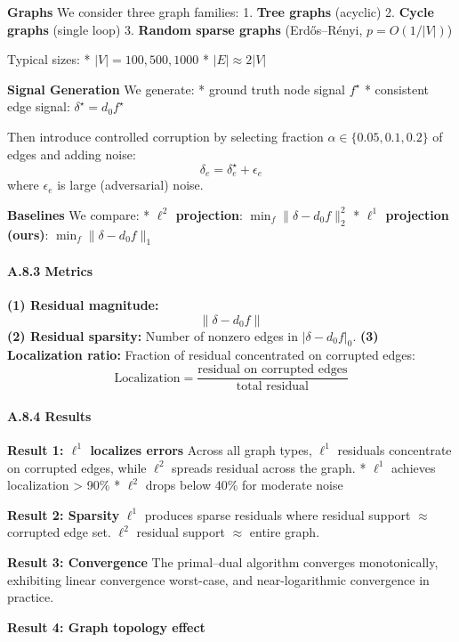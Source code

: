 \documentclass[
]{article}
\begin{document}
\textbf{Graphs} We consider three graph families: 1. \textbf{Tree
graphs} (acyclic) 2. \textbf{Cycle graphs} (single loop) 3.
\textbf{Random sparse graphs} (Erdős--Rényi, \(p = O(1/|V|)\))

Typical sizes: * \(|V| = 100, 500, 1000\) * \(|E| \approx 2|V|\)

\textbf{Signal Generation} We generate: * ground truth node signal
\(f^\star\) * consistent edge signal: \(\delta^\star = d_0 f^\star\)

Then introduce controlled corruption by selecting fraction
\(\alpha \in \{0.05, 0.1, 0.2\}\) of edges and adding noise:
\[ \delta_e = \delta^\star_e + \epsilon_e \] where \(\epsilon_e\) is
large (adversarial) noise.

\textbf{Baselines} We compare: * \textbf{\(\ell^2\) projection}:
\(\min_f \|\delta - d_0 f\|_2^2\) * \textbf{\(\ell^1\) projection
(ours)}: \(\min_f \|\delta - d_0 f\|_1\)

\paragraph{A.8.3 Metrics}\label{a.8.3-metrics}

\textbf{(1) Residual magnitude:} \[ \|\delta - d_0 f\| \] \textbf{(2)
Residual sparsity:} Number of nonzero edges in \(|\delta - d_0 f|_0\).
\textbf{(3) Localization ratio:} Fraction of residual concentrated on
corrupted edges:
\[ \text{Localization} = \frac{\text{residual on corrupted edges}}{\text{total residual}} \]

\paragraph{A.8.4 Results}\label{a.8.4-results}

\textbf{Result 1: \(\ell^1\) localizes errors} Across all graph types,
\(\ell^1\) residuals concentrate on corrupted edges, while \(\ell^2\)
spreads residual across the graph. * \(\ell^1\) achieves localization
\textgreater{} 90\% * \(\ell^2\) drops below 40\% for moderate noise

\textbf{Result 2: Sparsity} \(\ell^1\) produces sparse residuals where
residual support \(\approx\) corrupted edge set. \(\ell^2\) residual
support \(\approx\) entire graph.

\textbf{Result 3: Convergence} The primal--dual algorithm converges
monotonically, exhibiting linear convergence worst-case, and
near-logarithmic convergence in practice.

\textbf{Result 4: Graph topology effect}
\end{document}

